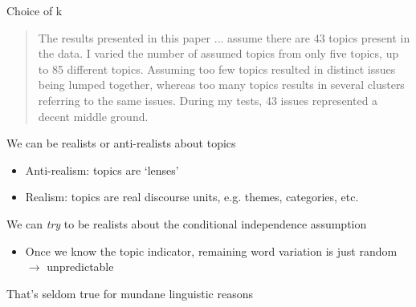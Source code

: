 \documentclass{hertieteaching}
\begin{document}
\begin{frame}{Choice of k}

\medskip
\begin{quote}
The results presented in this paper ... assume there are 43 
topics present in the data. I varied the number of assumed topics
from only five topics, up to 85 different topics. Assuming too few
topics resulted in distinct issues being lumped together, whereas 
too many topics results in several clusters referring to the same
issues. During my tests, 43 issues represented a decent middle
ground. \\
\hfill\parencite{Grimmer2010} 
\end{quote}

\pause

We can be realists or anti-realists about topics
\begin{itemize}
  \item Anti-realism: topics are `lenses'
  \item Realism: topics are real discourse units, e.g. themes, categories, etc.
\end{itemize}

\pause

We can \textit{try} to be realists about the conditional independence assumption
\begin{itemize}
  \item Once we know the topic indicator, remaining word variation is just random $\rightarrow$ unpredictable
\end{itemize}
That's seldom true for mundane linguistic reasons

\end{frame}








%
%
%  
%
\end{document}
